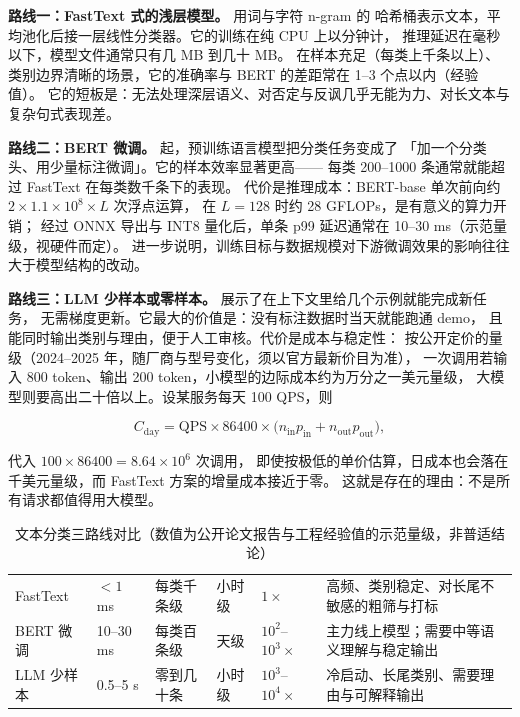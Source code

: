 \textbf{路线一：FastText 式的浅层模型。} \cite{bojanowski2017fasttext} 用词与字符 n-gram 的
哈希桶表示文本，平均池化后接一层线性分类器。它的训练在纯 CPU 上以分钟计，
推理延迟在毫秒以下，模型文件通常只有几 MB 到几十 MB。
在样本充足（每类上千条以上）、类别边界清晰的场景，它的准确率与 BERT 的差距常在 1--3 个点以内（经验值）。
它的短板是：无法处理深层语义、对否定与反讽几乎无能为力、对长文本与复杂句式表现差。

\textbf{路线二：BERT 微调。} \cite{devlin2019bert} 起，预训练语言模型把分类任务变成了
「加一个分类头、用少量标注微调」。它的样本效率显著更高——
每类 200--1000 条通常就能超过 FastText 在每类数千条下的表现。
代价是推理成本：BERT-base 单次前向约 $2 \times 1.1\times 10^{8} \times L$ 次浮点运算，
在 $L=128$ 时约 28 GFLOPs，是有意义的算力开销；
经过 ONNX 导出与 INT8 量化后，单条 p99 延迟通常在 10--30 ms（示范量级，视硬件而定）。
\cite{liu2019roberta} 进一步说明，训练目标与数据规模对下游微调效果的影响往往大于模型结构的改动。

\textbf{路线三：LLM 少样本或零样本。} \cite{brown2020gpt3} 展示了在上下文里给几个示例就能完成新任务，
无需梯度更新。它最大的价值是：没有标注数据时当天就能跑通 demo，
且能同时输出类别与理由，便于人工审核。代价是成本与稳定性：
按公开定价的量级（2024--2025 年，随厂商与型号变化，须以官方最新价目为准），
一次调用若输入 800 token、输出 200 token，小模型的边际成本约为万分之一美元量级，
大模型则要高出二十倍以上。设某服务每天 100 QPS，则

\begin{equation}
C_{\text{day}} = \text{QPS} \times 86400 \times \big(n_{\text{in}} p_{\text{in}} + n_{\text{out}} p_{\text{out}}\big),
\label{eq:llm-cost}
\end{equation}

代入 $100 \times 86400 = 8.64\times 10^{6}$ 次调用，
即使按极低的单价估算，日成本也会落在千美元量级，而 FastText 方案的增量成本接近于零。
这就是存在的理由：不是所有请求都值得用大模型。

\begin{table}[htbp]
\centering
\caption{文本分类三路线对比（数值为公开论文报告与工程经验值的示范量级，非普适结论）}
\label{tab:cls-route}
\small
\begin{tabularx}{\textwidth}{L{1.7cm} L{1.7cm} L{1.9cm} L{1.7cm} L{2.0cm} Y}
\toprule
{} &  &  &  &  &  \\
\midrule
FastText & $<1$ ms & 每类千条级 & 小时级 & $1\times$ & 高频、类别稳定、对长尾不敏感的粗筛与打标 \\
\addlinespace
BERT 微调 & 10--30 ms & 每类百条级 & 天级 & $10^2$--$10^3\times$ & 主力线上模型；需要中等语义理解与稳定输出 \\
\addlinespace
LLM 少样本 & 0.5--5 s & 零到几十条 & 小时级 & $10^3$--$10^4\times$ & 冷启动、长尾类别、需要理由与可解释输出 \\
\bottomrule
\end{tabularx}
\end{table}

